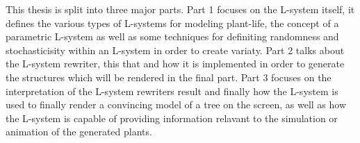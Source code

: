 \begin{flushleft}

This thesis is split into three major parts. Part 1 focuses on the L-system itself, it defines the various types of L-systems for modeling plant-life, the concept of a parametric L-system as well as some techniques for definiting randomness and stochasticisity within an L-system in order to create variaty. Part 2 talks about the L-system rewriter, this that and how it is implemented in order to generate the structures which will be rendered in the final part. Part 3 focuses on the interpretation of the L-system rewriters result and finally how the L-system is used to finally render a convincing model of a tree on the screen, as well as how the L-system is capable of providing information relavant to the simulation or animation of the generated plants.

\end{flushleft}




